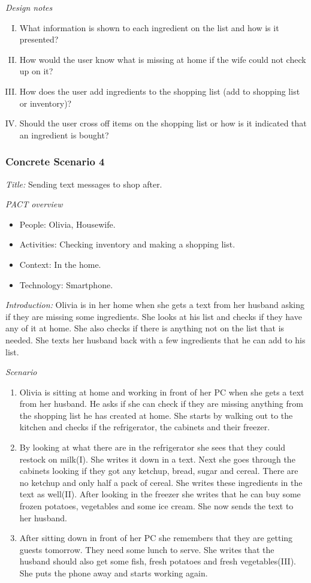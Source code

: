 \emph{Design notes}

\begin{enumerate} [(I)]
\item What information is shown to each ingredient on the list and how is it presented?
\item How would the user know what is missing at home if the wife could not check up on it?
\item How does the user add ingredients to the shopping list (add to shopping list or inventory)?
\item Should the user cross off items on the shopping list or how is it indicated that an ingredient is bought? 
\end{enumerate}

\subsubsection{Concrete Scenario 4} \label{ConcreteScenario4}

\emph{Title:} Sending text messages to shop after.

\emph{PACT overview}
\begin{itemize}
\item People: Olivia, Housewife.  
\item Activities: Checking inventory and making a shopping list.
\item Context: In the home.
\item Technology: Smartphone.  
\end{itemize}

\emph{Introduction:} Olivia is in her home when she gets a text from her husband asking if they are missing some ingredients. She looks at his list and checks if they have any of it at home. She also checks if there is anything not on the list that is needed. She texts her husband back with a few ingredients that he can add to his list.

\emph{Scenario}
\begin{enumerate}
\item Olivia is sitting at home and working in front of her PC when she gets a text from her husband. He asks if she can check if they are missing anything from the shopping list he has created at home. She starts by walking out to the kitchen and checks if the refrigerator, the cabinets and their freezer.
\item By looking at what there are in the refrigerator she sees that they could restock on milk(I). She writes it down in a text. Next she goes through the cabinets looking if they got any ketchup, bread, sugar and cereal. There are no ketchup and only half a pack of cereal. She writes these ingredients in the text as well(II). After looking in the freezer she writes that he can buy some frozen potatoes, vegetables and some ice cream. She now sends the text to her husband.  
\item After sitting down in front of her PC she remembers that they are getting guests tomorrow. They need some lunch to serve. She writes that the husband should also get some fish, fresh potatoes and fresh vegetables(III). She puts the phone away and starts working again. 
\end{enumerate}


